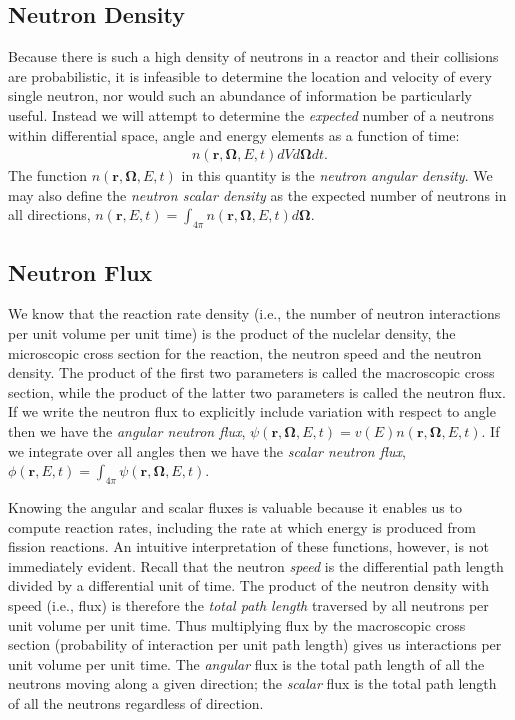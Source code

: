 \documentclass[11pt]{article}
\renewcommand\vec{\mathbf}
\begin{document}
\subsection{Neutron Density}
\label{sec:orgheadline1}
Because there is such a high density of neutrons in a reactor and their collisions are probabilistic, it is infeasible to determine the location and velocity of every single neutron, nor would such an abundance of information be particularly useful.  Instead we will attempt to determine the \emph{expected} number of a neutrons within differential space, angle and energy elements as a function of time:
\begin{align}
  n(\vec{r},\vec{\Omega},E,t) dV d\vec{\Omega} dt.
\end{align}
The function \(n(\vec{r},\vec{\Omega},E,t)\) in this quantity is the \emph{neutron angular density}.  We may also define the \emph{neutron scalar density} as the expected number of neutrons in all directions, \(n(\vec{r},E,t) = \int_{4\pi} n(\vec{r},\vec{\Omega},E,t) d\vec{\Omega}\).

\subsection{Neutron Flux}
\label{sec:orgheadline2}
We know that the reaction rate density (i.e., the number of neutron interactions per unit volume per unit time) is the product of the nuclelar density, the microscopic cross section for the reaction, the neutron speed and the neutron density.  The product of the first two parameters is called the macroscopic cross section, while the product of the latter two parameters is called the neutron flux.  If we write the neutron flux to explicitly include variation with respect to angle then we have the \emph{angular neutron flux}, \(\psi(\vec{r},\vec{\Omega},E,t) = v(E)n(\vec{r},\vec{\Omega},E,t)\).  If we integrate over all angles then we have the \emph{scalar neutron flux}, \(\phi(\vec{r},E,t) = \int_{4\pi} \psi(\vec{r},\vec{\Omega},E,t)\).

Knowing the angular and scalar fluxes is valuable because it enables us to compute reaction rates, including the rate at which energy is produced from fission reactions.  An intuitive interpretation of these functions, however, is not immediately evident.  Recall that the neutron \emph{speed} is the differential path length divided by a differential unit of time.  The product of the neutron density with speed (i.e., flux) is therefore the \emph{total path length} traversed by all neutrons per unit volume per unit time.  Thus multiplying flux by the macroscopic cross section (probability of interaction per unit path length) gives us interactions per unit volume per unit time.  The \emph{angular} flux is the total path length of all the neutrons moving along a given direction; the \emph{scalar} flux is the total path length of all the neutrons regardless of direction.
\end{document}
